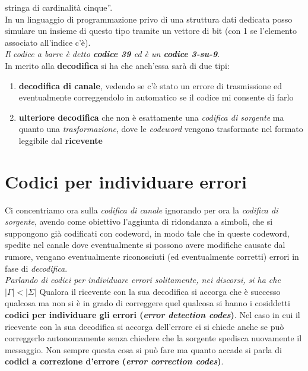 \documentclass[a4paper,12pt, oneside]{book}
\begin{document}
stringa di cardinalità cinque''.\\
In un linguaggio di programmazione privo di una struttura dati dedicata posso
simulare un insieme di questo tipo tramite un vettore di bit (con 1 se
l'elemento associato all'indice c'è).\\
\textit{Il codice a barre è detto \textbf{codice 39} ed è un \textbf{codice
    3-su-9}}. \\
In merito alla \textbf{decodifica} si ha che anch'essa sarà di due tipi:
\begin{enumerate}
  \item \textbf{decodifica di canale}, vedendo se c'è stato un errore di
  trasmissione ed eventualmente correggendolo in automatico se il codice mi
  consente di farlo
  \item \textbf{ulteriore decodifica} che non è esattamente una \textit{codifica
    di sorgente} ma quanto una \textit{trasformazione}, dove le
  \textit{codeword} vengono trasformate nel formato leggibile dal
  \textbf{ricevente} 
\end{enumerate}
\section{Codici per individuare errori}
Ci concentriamo ora sulla \textit{codifica di canale} ignorando per ora la
\textit{codifica di sorgente}, avendo come obiettivo l'aggiunta di ridondanza a
simboli, che si suppongono già codificati con codeword, in modo tale che in
queste codeword, spedite nel canale dove eventualmente si possono avere
modifiche causate dal rumore, vengano eventualmente riconosciuti (ed
eventualmente corretti) errori in fase di \textit{decodifica}.\\
\textit{Parlando di \emph{codici per individuare errori} solitamente, nei
  discorsi, si ha che $|\Gamma|<|\Sigma|$}
Qualora il ricevente con la sua decodifica si accorga che è successo qualcosa ma
non si è in grado di 
correggere quel qualcosa si hanno i cosiddetti \textbf{codici per individuare
  gli errori (\textit{error detection codes})}. Nel caso in cui il ricevente con
la sua decodifica si accorga dell'errore ci si chiede anche se può correggerlo
autonomamente senza chiedere che la sorgente spedisca nuovamente il
messaggio. Non sempre questa cosa si può fare ma quanto accade si parla di
\textbf{codici a correzione d'errore (\textit{error correction codes})}.
\end{document}
